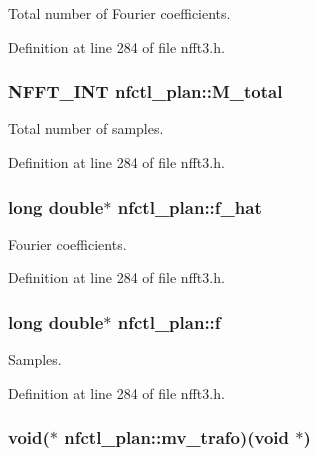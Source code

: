 Total number of Fourier coefficients. 



Definition at line 284 of file nfft3.\-h.

\hypertarget{structnfctl__plan_a6dc9d1ee3a4b66708cc57410f83dd4e9}{
\subsubsection[{M\-\_\-total}]{\setlength{\rightskip}{0pt plus 5cm}N\-F\-F\-T\-\_\-\-I\-N\-T nfctl\-\_\-plan\-::\-M\-\_\-total}}\label{structnfctl__plan_a6dc9d1ee3a4b66708cc57410f83dd4e9}


Total number of samples. 



Definition at line 284 of file nfft3.\-h.

\hypertarget{structnfctl__plan_aede4fbbe9a7b666d5d5fbd62e62bf103}{
\subsubsection[{f\-\_\-hat}]{\setlength{\rightskip}{0pt plus 5cm}long double$\ast$ nfctl\-\_\-plan\-::f\-\_\-hat}}\label{structnfctl__plan_aede4fbbe9a7b666d5d5fbd62e62bf103}


Fourier coefficients. 



Definition at line 284 of file nfft3.\-h.

\hypertarget{structnfctl__plan_ae09e0a759e136ad020a97e6c76efbb30}{
\subsubsection[{f}]{\setlength{\rightskip}{0pt plus 5cm}long double$\ast$ nfctl\-\_\-plan\-::f}}\label{structnfctl__plan_ae09e0a759e136ad020a97e6c76efbb30}


Samples. 



Definition at line 284 of file nfft3.\-h.

\hypertarget{structnfctl__plan_a42f0c32b080677a57f82ccf23d018da2}{
\subsubsection[{mv\-\_\-trafo}]{\setlength{\rightskip}{0pt plus 5cm}void($\ast$ nfctl\-\_\-plan\-::mv\-\_\-trafo)(void $\ast$)}}\label{structnfctl__plan_a42f0c32b080677a57f82ccf23d018da2}


